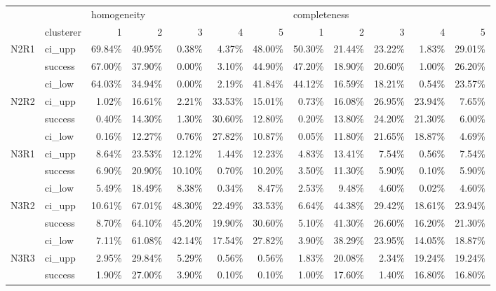 \begin{tabular}{llrrrrrrrrrr}
\toprule
     & {} & \multicolumn{5}{l}{homogeneity} & \multicolumn{5}{l}{completeness} \\
     & clusterer &           1 &      2 &      3 &      4 &      5 &            1 &      2 &      3 &      4 &      5 \\
\midrule
N2R1 & ci\_upp &      69.84\% & 40.95\% &  0.38\% &  4.37\% & 48.00\% &       50.30\% & 21.44\% & 23.22\% &  1.83\% & 29.01\% \\
     & success &      67.00\% & 37.90\% &  0.00\% &  3.10\% & 44.90\% &       47.20\% & 18.90\% & 20.60\% &  1.00\% & 26.20\% \\
     & ci\_low &      64.03\% & 34.94\% &  0.00\% &  2.19\% & 41.84\% &       44.12\% & 16.59\% & 18.21\% &  0.54\% & 23.57\% \\
N2R2 & ci\_upp &       1.02\% & 16.61\% &  2.21\% & 33.53\% & 15.01\% &        0.73\% & 16.08\% & 26.95\% & 23.94\% &  7.65\% \\
     & success &       0.40\% & 14.30\% &  1.30\% & 30.60\% & 12.80\% &        0.20\% & 13.80\% & 24.20\% & 21.30\% &  6.00\% \\
     & ci\_low &       0.16\% & 12.27\% &  0.76\% & 27.82\% & 10.87\% &        0.05\% & 11.80\% & 21.65\% & 18.87\% &  4.69\% \\
N3R1 & ci\_upp &       8.64\% & 23.53\% & 12.12\% &  1.44\% & 12.23\% &        4.83\% & 13.41\% &  7.54\% &  0.56\% &  7.54\% \\
     & success &       6.90\% & 20.90\% & 10.10\% &  0.70\% & 10.20\% &        3.50\% & 11.30\% &  5.90\% &  0.10\% &  5.90\% \\
     & ci\_low &       5.49\% & 18.49\% &  8.38\% &  0.34\% &  8.47\% &        2.53\% &  9.48\% &  4.60\% &  0.02\% &  4.60\% \\
N3R2 & ci\_upp &      10.61\% & 67.01\% & 48.30\% & 22.49\% & 33.53\% &        6.64\% & 44.38\% & 29.42\% & 18.61\% & 23.94\% \\
     & success &       8.70\% & 64.10\% & 45.20\% & 19.90\% & 30.60\% &        5.10\% & 41.30\% & 26.60\% & 16.20\% & 21.30\% \\
     & ci\_low &       7.11\% & 61.08\% & 42.14\% & 17.54\% & 27.82\% &        3.90\% & 38.29\% & 23.95\% & 14.05\% & 18.87\% \\
N3R3 & ci\_upp &       2.95\% & 29.84\% &  5.29\% &  0.56\% &  0.56\% &        1.83\% & 20.08\% &  2.34\% & 19.24\% & 19.24\% \\
     & success &       1.90\% & 27.00\% &  3.90\% &  0.10\% &  0.10\% &        1.00\% & 17.60\% &  1.40\% & 16.80\% & 16.80\% \\

\end{tabular}
